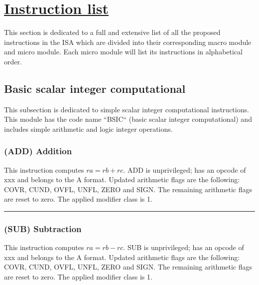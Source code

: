\documentclass{article}
\begin{document}
    \clearpage


    \section[Instruction list]{\LARGE\underline{Instruction list}} %

        \vspace{10pt}

        This section is dedicated to a full and extensive list of all the proposed instructions in the ISA which are divided into their corresponding macro module and micro module. Each micro module will list its instructions in alphabetical order.

        \subsection{Basic scalar integer computational}

            \vspace{10pt}

            This subsection is dedicated to simple scalar integer computational instructions. This module has the code name ``BSIC`` (basic scalar integer computational) and includes simple arithmetic and logic integer operations.

            \subsubsection{(ADD) Addition}

                This instruction computes \(ra = rb + rc\). ADD is unprivileged; has an opcode of xxx and belongs to the A format. Updated arithmetic flags are the following: COVR, CUND, OVFL, UNFL, ZERO and SIGN. The remaining arithmetic flags are reset to zero. The applied modifier class is 1.

            \par\noindent\rule{\textwidth}{0.4pt}

            \subsubsection{(SUB) Subtraction}

                This instruction computes \(ra = rb - rc\). SUB is unprivileged; has an opcode of xxx and belongs to the A format. Updated arithmetic flags are the following: COVR, CUND, OVFL, UNFL, ZERO and SIGN. The remaining arithmetic flags are reset to zero. The applied modifier class is 1.
\end{document}
